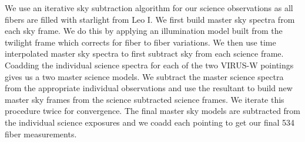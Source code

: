 \documentclass[%
 aip,
 twocolumn,
 jmp,%
 amsmath,amssymb,
 reprint,%
]{aastex61}
\begin{document}
We use an iterative sky subtraction algorithm for our science observations as all fibers are filled with starlight from Leo I.  We first build master sky spectra from each sky frame.  We do this by applying an illumination model built from the twilight frame which corrects for fiber to fiber variations.  We then use time interpolated master sky spectra to first subtract sky from each science frame.  Coadding the individual science spectra for each of the two VIRUS-W pointings gives us a two master science models.  We subtract the master science spectra from the appropriate individual observations and use the resultant to build new master sky frames from the science subtracted science frames.  We iterate this procedure twice for convergence.  The final master sky models are subtracted from the individual science exposures and we coadd each pointing to get our final 534 fiber measurements.
\end{document}

